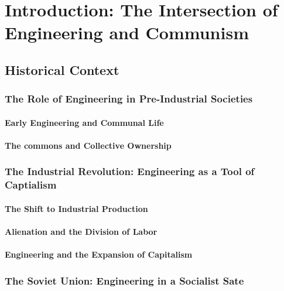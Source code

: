 \chapter{Introduction: The Intersection of Engineering and Communism}

\section{Historical Context}

\subsection{The Role of Engineering in Pre-Industrial Societies}

\subsubsection{Early Engineering and Communal Life}

\subsubsection{The commons and Collective Ownership}

\newpage

\subsection{The Industrial Revolution: Engineering as a Tool of Captialism}

\subsubsection{The Shift to Industrial Production}

\subsubsection{Alienation and the Division of Labor}

\subsubsection{Engineering and the Expansion of Capitalism}

\newpage

\subsection{The Soviet Union: Engineering in a Socialist Sate}

